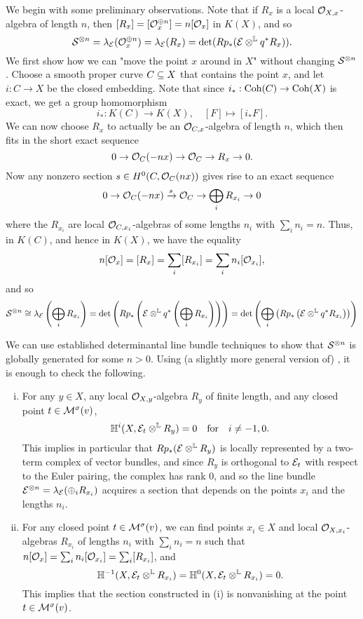 \documentclass[letterpaper,10pt]{article}
\theoremstyle{remark}
\begin{document}
We begin with some preliminary observations. Note that if $R_x$ is a local $\mathcal{O}_{X,x}$-algebra of length $n$, then $[R_x] = [\mathcal{O}_x^{\oplus n}] = n[\mathcal{O}_x]$ in $K(X)$, and so
\[ \mathcal{S}^{\otimes n} = \lambda_{\mathcal{E}}(\mathcal{O}_x^{\oplus n}) = \lambda_{\mathcal{E}}(R_x) = \det(R p_*(\mathcal{E} \otimes^{\mathbb{L}} q^* R_x)). \]
We first show how we can "move the point $x$ around in $X$" without changing $\mathcal{S}^{\otimes n}$. Choose a smooth proper curve $C \subseteq X$ that contains the point $x$, and let $i: C \to X$ be the closed embedding. Note that since $i_*: \mathrm{Coh}(C) \to \mathrm{Coh}(X)$ is exact, we get a group homomorphism 
\[ i_*: K(C) \to K(X), \quad [F] \mapsto [i_* F]. \]
We can now choose $R_x$ to actually be an $\mathcal{O}_{C,x}$-algebra of length $n$, which then fits in the short exact sequence
\begin{equation}\label{ses1}
    0 \to \mathcal{O}_C(-n x) \to \mathcal{O}_C \to R_x \to 0. 
\end{equation}
Now any nonzero section $s \in H^0(C, \mathcal{O}_C(n x))$ gives rise to an exact sequence
\begin{equation}\label{ses2}
    0 \to \mathcal{O}_C(-n x) \xrightarrow{s} \mathcal{O}_C \to \bigoplus_i R_{x_i} \to 0 
\end{equation}
where the $R_{x_i}$ are local $\mathcal{O}_{C,x_i}$-algebras of some lengths $n_i$ with $\sum_i n_i = n$. Thus, in $K(C)$, and hence in $K(X)$, we have the equality
\begin{equation}\label{K-eq}
    n[\mathcal{O}_x] = [R_x] = \sum_i [R_{x_i}] = \sum_i n_i [\mathcal{O}_{x_i}],
\end{equation}
and so
\[ \mathcal{S}^{\otimes n} \cong \lambda_{\mathcal{E}}\left(\bigoplus_i R_{x_i}\right) = \det\left(R p_*\left(\mathcal{E} \otimes^{\mathbb{L}} q^*\left(\bigoplus_i R_{x_i}\right)\right)\right) = \det\left(\bigoplus_i \left(R p_*\left(\mathcal{E} \otimes^{\mathbb{L}} q^* R_{x_i}\right)\right)\right) \]

We can use established determinantal line bundle techniques to show that $\mathcal{S}^{\otimes n}$ is globally generated for some $n > 0$. Using (a slightly more general version of) \cite[Lemma 4.1]{t}, it is enough to check the following.
\begin{enumerate}[(i)]
    \item For any $y \in X$, any local $\mathcal{O}_{X,y}$-algebra $R_y$ of finite length, and any closed point $t \in \mathcal{M}^{\sigma}(v)$, 
    \[ \mathbb{H}^i(X, \mathcal{E}_t \otimes^{\mathbb{L}} R_y) = 0 \quad \mathrm{for} \quad i \neq -1, 0. \]
    This implies in particular that $R p_*(\mathcal{E} \otimes^{\mathbb{L}} R_y)$ is locally represented by a two-term complex of vector bundles, and since $R_y$ is orthogonal to $\mathcal{E}_t$ with respect to the Euler pairing, the complex has rank 0, and so the line bundle $\mathcal{E}^{\otimes n} = \lambda_{\mathcal{E}}(\oplus_i R_{x_i})$ acquires a section that depends on the points $x_i$ and the lengths $n_i$.
    \item For any closed point $t \in \mathcal{M}^\sigma(v)$, we can find points $x_i \in X$ and local $\mathcal{O}_{X,x_i}$-algebras $R_{x_i}$ of lengths $n_i$ with $\sum_i n_i = n$ such that $n [\mathcal{O}_x] = \sum_i n_i [\mathcal{O}_{x_i}] = \sum_i [R_{x_i}]$, and
    \[ \mathbb{H}^{-1}(X, \mathcal{E}_t \otimes^{\mathbb{L}} R_{x_i}) = \mathbb{H}^0(X, \mathcal{E}_t \otimes^{\mathbb{L}} R_{x_i}) = 0. \]
    This implies that the section constructed in (i) is nonvanishing at the point $t \in \mathcal{M}^\sigma(v)$.
\end{enumerate} 
\end{document}
